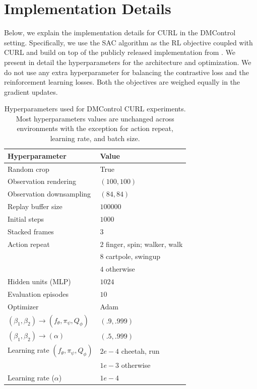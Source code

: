 \section{Implementation Details}
\label{appendix:hyperparams}

Below, we explain the implementation details for CURL in the DMControl setting. Specifically, we use the SAC algorithm as the RL objective coupled with CURL and build on top of the publicly released implementation from \citet{yarats2019improving}. We present in detail the hyperparameters for the architecture and optimization. We do not use any extra hyperparameter for balancing the contrastive loss and the reinforcement learning losses. Both the objectives are weighed equally in the gradient updates.

\begin{table}[h]
\caption{Hyperparameters used for DMControl CURL experiments. Most hyperparameters values are unchanged across environments with the exception for action repeat, learning rate, and batch size.}

\label{table:hyperparameters}
\vskip 0.15in
\begin{center}
\begin{small}
\begin{tabular}{ll}
\toprule
\textbf{Hyperparameter} & \textbf{Value}  \\
\midrule
Random crop    & True  \\ 
Observation rendering    & $(100,100)$  \\ 
Observation downsampling    & $(84,84)$  \\ 
Replay buffer size    & $100000$ \\ 
Initial steps    & $1000$  \\ 
Stacked frames    & $3$  \\ 
Action repeat    & $2$ finger, spin; walker, walk\\
 & $8$ cartpole, swingup \\
 & $4$ otherwise  \\
Hidden units (MLP)    & $1024$  \\ 
Evaluation episodes    & $10$  \\ 
Optimizer    & Adam  \\ 
$(\beta_1,\beta_2) \rightarrow (f_\theta, \pi_\psi, Q_\phi)$   & $(.9,.999)$  \\
$(\beta_1,\beta_2) \rightarrow (\alpha)$   & $(.5,.999)$  \\
Learning rate $(f_\theta, \pi_\psi, Q_\phi)$     & $2e-4$ cheetah, run \\
& $1e-3$ otherwise\\ 
Learning rate ($\alpha$) & $1e-4$ \\


\end{tabular}
\end{small}
\end{center}
\end{table}
